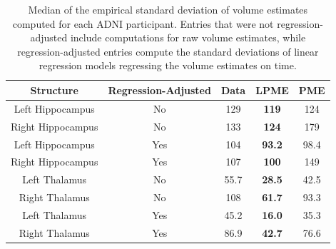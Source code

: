 \documentclass[12pt]{article}
\theoremstyle{definition}
\begin{document}








\begin{table}[ht]
  \centering
  \begin{tabular}{|c c c c c|}
    \hline
    Structure & Regression-Adjusted & Data & LPME & PME  \\
    \hline
    Left Hippocampus & No & 129 & \textbf{119} & 124 \\
    Right Hippocampus & No & 133 & \textbf{124} & 179 \\
    Left Hippocampus & Yes & 104 & \textbf{93.2} & 98.4 \\
    Right Hippocampus & Yes & 107 & \textbf{100} & 149 \\
    Left Thalamus & No & 55.7 & \textbf{28.5} & 42.5 \\
    Right Thalamus & No & 108 & \textbf{61.7} & 93.3 \\
    Left Thalamus & Yes & 45.2 & \textbf{16.0} & 35.3 \\
    Right Thalamus & Yes & 86.9 & \textbf{42.7} & 76.6 \\
    \hline
  \end{tabular}
  \caption{{\footnotesize Median of the empirical standard deviation of volume estimates computed for each ADNI participant. Entries that were not regression-adjusted include computations for raw volume estimates, while regression-adjusted entries compute the standard deviations of linear regression models regressing the volume estimates on time.} }
  \label{table:adni_volume_sds}
\end{table}
\end{document}
